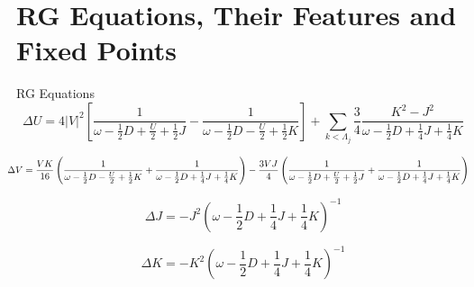 \documentclass[aspectratio=169]{beamer}
\begin{document}
\section{RG Equations, Their Features and Fixed Points}
\begin{frame}[noframenumbering]{RG Equations}
\[
\Delta U = 4|V|^2 \left[\frac{1}{\omega - \frac{1}{2}D + \frac{U}{2} + \frac{1}{2}J}  - \frac{1}{\omega - \frac{1}{2}D - \frac{U}{2} + \frac{1}{2}K}\right] + \sum_{k<\Lambda_j} \frac{3}{4}\frac{K^2 - J^2}{\omega - \frac{1}{2}D + \frac{1}{4}J + \frac{1}{4}K}
\]

\[
	\hspace*{-10pt}\Delta V = \frac{V K}{16}\left(\frac{1}{\omega - \frac{1}{2}D - \frac{U}{2} + \frac{1}{2}K} + \frac{1}{\omega - \frac{1}{2}D + \frac{1}{4}J + \frac{1}{4}K} \right) - \frac{3VJ}{4}\left( \frac{1}{\omega - \frac{1}{2}D + \frac{U}{2} + \frac{1}{2}J} + \frac{1}{\omega - \frac{1}{2}D + \frac{1}{4}J + \frac{1}{4}K} \right)
\]

\[
\Delta J = - J^2\left(\omega - \frac{1}{2}D + \frac{1}{4}J + \frac{1}{4}K\right)^{-1}
\]

\[
\Delta K = - K^2\left(\omega - \frac{1}{2}D + \frac{1}{4}J + \frac{1}{4}K\right)^{-1}
\]
\end{frame}
\end{document}
